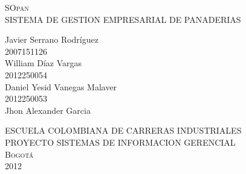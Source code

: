 \begin{titlepage}
\setlength{\parindent}{0pt} \setlength{\parskip}{0pt}

\begin{center}

\textsc{\large SOpan}\\[0.2cm]
{\large SISTEMA DE GESTION EMPRESARIAL DE PANADERIAS}\\[1cm]
\end{center}

\begin{center}

\end{center}

\begin{center}

\vfill
{\Large Javier Serrano Rodr\'iguez\\2007151126\\William D\'iaz Vargas\\2012250054\\Daniel Yesid Vanegas Malaver\\2012250053\\Jhon Alexander Garcia\\[0.4cm]}
\end{center}
\vfill
\begin{center}
\large \textsc{ESCUELA COLOMBIANA DE CARRERAS INDUSTRIALES\\PROYECTO SISTEMAS DE INFORMACION GERENCIAL\\Bogot\'a\\2012}
\end{center}
\end{titlepage}
